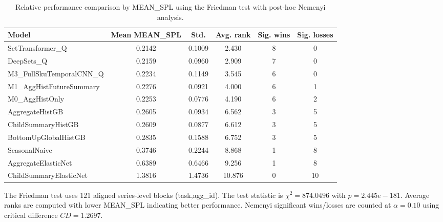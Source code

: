\begin{table}[H]
\centering
\caption{Relative performance comparison by MEAN_SPL using the Friedman test with post-hoc Nemenyi analysis.}
\label{tab:stats_mean_spl}
\begin{threeparttable}
\begin{tabular}{lccccc}
\toprule
Model & Mean MEAN_SPL & Std. & Avg. rank & Sig. wins & Sig. losses \\
\midrule
SetTransformer\_Q & 0.2142 & 0.1009 & 2.430 & 8 & 0 \\
DeepSets\_Q & 0.2159 & 0.0960 & 2.909 & 7 & 0 \\
M3\_FullSkuTemporalCNN\_Q & 0.2234 & 0.1149 & 3.545 & 6 & 0 \\
M1\_AggHistFutureSummary & 0.2276 & 0.0921 & 4.000 & 6 & 1 \\
M0\_AggHistOnly & 0.2253 & 0.0776 & 4.190 & 6 & 2 \\
AggregateHistGB & 0.2605 & 0.0934 & 6.562 & 3 & 5 \\
ChildSummaryHistGB & 0.2609 & 0.0877 & 6.612 & 3 & 5 \\
BottomUpGlobalHistGB & 0.2835 & 0.1588 & 6.752 & 3 & 5 \\
SeasonalNaive & 0.3746 & 0.2244 & 8.868 & 1 & 8 \\
AggregateElasticNet & 0.6389 & 0.6466 & 9.256 & 1 & 8 \\
ChildSummaryElasticNet & 1.3816 & 1.4736 & 10.876 & 0 & 10 \\
\bottomrule
\end{tabular}
\begin{tablenotes}
\footnotesize \item The Friedman test uses 121 aligned series-level blocks (task,agg\_id). The test statistic is $\chi^2=874.0496$ with $p=2.445e-181$. Average ranks are computed with lower MEAN_SPL indicating better performance. Nemenyi significant wins/losses are counted at $\alpha=0.10$ using critical difference $CD=1.2697$.
\end{tablenotes}
\end{threeparttable}
\end{table}
